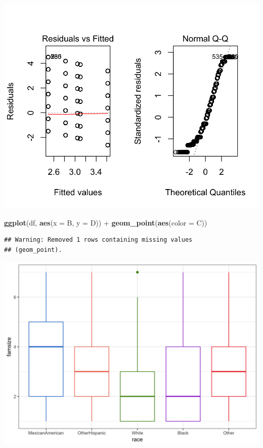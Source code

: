 \documentclass[]{tufte-book}
\newenvironment{Shaded}{}{}
\newcommand{\KeywordTok}[1]{\textcolor[rgb]{0.00,0.44,0.13}{\textbf{#1}}}
\newcommand{\DataTypeTok}[1]{\textcolor[rgb]{0.56,0.13,0.00}{#1}}
\newcommand{\StringTok}[1]{\textcolor[rgb]{0.25,0.44,0.63}{#1}}
\newcommand{\OperatorTok}[1]{\textcolor[rgb]{0.40,0.40,0.40}{#1}}
\newcommand{\NormalTok}[1]{#1}
\theoremstyle{definition}
\theoremstyle{definition}
\theoremstyle{remark}
\begin{document}
\includegraphics{_main_files/figure-latex/unnamed-chunk-63-1}

\begin{Shaded}
\begin{Highlighting}[]
\KeywordTok{ggplot}\NormalTok{(df, }\KeywordTok{aes}\NormalTok{(}\DataTypeTok{x =}\NormalTok{ B, }\DataTypeTok{y =}\NormalTok{ D)) }\OperatorTok{+}\StringTok{ }\KeywordTok{geom_point}\NormalTok{(}\KeywordTok{aes}\NormalTok{(}\DataTypeTok{color =}\NormalTok{ C))}
\end{Highlighting}
\end{Shaded}

\begin{verbatim}
## Warning: Removed 1 rows containing missing values
## (geom_point).
\end{verbatim}

\includegraphics{_main_files/figure-latex/unnamed-chunk-64-1}
\end{document}
